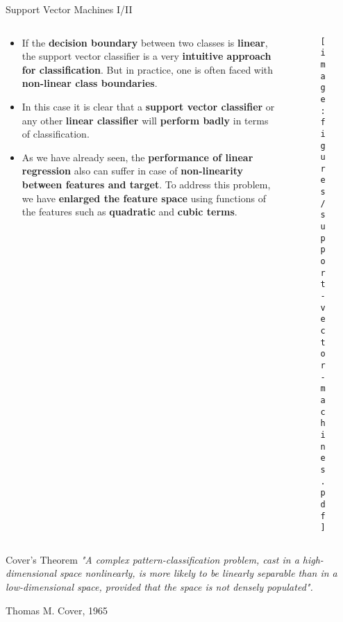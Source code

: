 \documentclass[document.tex]{subfiles}
\begin{document}
    \begin{frame}{Support Vector Machines I/II}
        \begin{columns}
            \begin{column}{0.6\textwidth}
                \begin{itemize}
                    \item If the \textbf{decision boundary} between two classes is \textbf{linear}, the support vector classifier is a very \textbf{intuitive approach for classification}. But in practice, one is often faced with \textbf{non-linear class boundaries}. 
                    \item In this case it is clear that a \textbf{support vector classifier} or any other \textbf{linear classifier} will \textbf{perform badly} in terms of classification.
                    \item As we have already seen, the \textbf{performance of linear regression} also can suffer in case of \textbf{non-linearity between features and target}. To address this problem, we have \textbf{enlarged the feature space} using functions of the features such as \textbf{quadratic} and \textbf{cubic terms}.
                \end{itemize}
            \end{column}
            \begin{column}{0.4\textwidth}
                \begin{figure}
                    \label{fig:support-vector-machines}
                    \texttt{[image: figures/support-vector-machines.pdf]}
                \end{figure}
            \end{column}
        \end{columns}
    \end{frame}
    
    \begin{frame}{Cover's Theorem}
        \textit{ "A complex pattern-classification problem, cast in a high-dimensional space nonlinearly, is more likely to be linearly separable than in a low-dimensional space, provided that the space is not densely populated".}
    
        Thomas M. Cover, 1965
    \end{frame}
    
\end{document}

